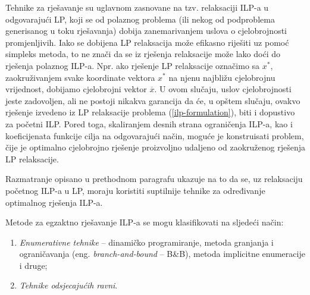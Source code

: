 \documentclass[b5paper, utf8, 11pt, colorlinks]{book}
\theoremstyle{definition}
\begin{document}
Tehnike za rješavanje su uglavnom zasnovane na tzv. relaksaciji ILP-a u odgovarajući LP, koji se od polaznog problema (ili nekog od podproblema generisanog u toku rješavanja) dobija zanemarivanjem uslova o cjelobrojnosti promjenljivih.  Iako se dobijena  LP relaksacija može efikasno riješiti uz pomoć simpleks metoda, to ne znači da se iz rješenja relaksacije može lako doći do rješenja polaznog ILP-a. Npr. ako rješenje LP relaksacije označimo sa $x^*$, zaokruživanjem svake koordinate vektora $x^*$ na njenu najbližu cjelobrojnu vrijednost, dobijamo cjelobrojni vektor  $\overline{x}$.  U ovom slučaju, uslov cjelobrojnosti jeste zadovoljen, ali ne postoji nikakva garancija da će, u opštem slučaju,  ovakvo rješenje izvedeno iz LP relaksacije problema (\ref{ilp-formulation}), biti i  dopustivo za početni ILP. Pored toga, skaliranjem desnih strana ograničenja ILP-a, kao i koeficijenata funkcije cilja na odgovarajući način, moguće je konstruisati problem, čije je optimalno cjelobrojno rješenje proizvoljno udaljeno od zaokruženog rješenja LP relaksacije. 
 
 Razmatranje opisano u prethodnom paragrafu ukazuje na to da se, uz relaksaciju početnog ILP-a u LP, moraju koristiti suptilnije tehnike za određivanje optimalnog rješenja ILP-a. 
 
Metode za egzaktno rješavanje ILP-a se mogu klasifikovati na sljedeći način:
 \begin{enumerate}
     \item \emph{Enumerativne tehnike} -- dinamičko programiranje, metoda granjanja i ograničavanja (eng. \emph{branch-and-bound} -- B\&B), metoda implicitne enumeracije i druge;
     \item \emph{Tehnike odsjecajućih ravni}.
 \end{enumerate}
\end{document}
